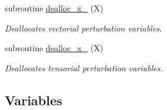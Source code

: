 \begin{DoxyCompactItemize}
subroutine \hyperlink{namespacex__vars_a20679fb70a3dbfcdf2479b1219b847d1}{dealloc\+\_\+x\+\_} (X)
\begin{DoxyCompactList}\small\item\em Deallocates vectorial perturbation variables. \end{DoxyCompactList}\item 
subroutine \hyperlink{namespacex__vars_ac052defbe764e6d02f436bd29d72db6d}{dealloc\+\_\+x\+\_} (X)
\begin{DoxyCompactList}\small\item\em Deallocates tensorial perturbation variables. \end{DoxyCompactList}\end{DoxyCompactItemize}
\subsection*{Variables}
